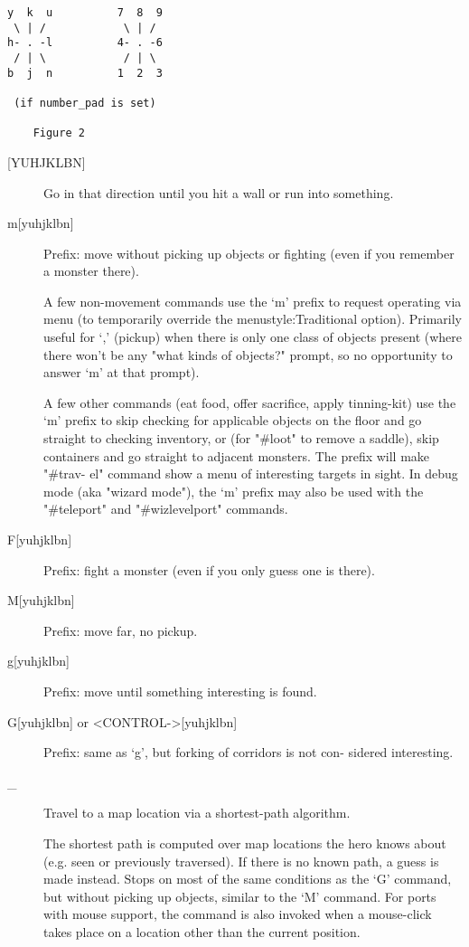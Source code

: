 \documentclass[11pt]{article}
\begin{document}
\begin{verbatim}
y  k  u          7  8  9
 \ | /            \ | /
h- . -l          4- . -6
 / | \            / | \
b  j  n          1  2  3

 (if number_pad is set)

	Figure 2
\end{verbatim}

\begin{description}
\item[{[YUHJKLBN]}] Go in that direction until you hit a wall or run into
something.

\item[{m[yuhjklbn]}] Prefix:   move  without picking up objects or
fighting (even if you remember a monster there).  

A few non-movement commands use the `m'  prefix to request operating
via menu (to temporarily override the menustyle:Traditional option).
Primarily useful for `,' (pickup) when there is only one class of
objects present (where there won't be any "what kinds of objects?"
prompt, so no opportunity to answer `m' at that prompt). 

A few other commands (eat food, offer sacrifice, apply tinning-kit)
use the `m' prefix to skip checking for applicable objects on the
floor and go straight to checking inventory, or (for "\#loot" to
remove a saddle), skip containers and go straight to adjacent
monsters. The prefix will make "\#trav- el" command show a menu of
interesting targets in sight. In debug mode (aka "wizard mode"), the
`m' prefix may also be used with the "\#teleport" and "\#wizlevelport"
commands.

\item[{F[yuhjklbn]}] Prefix: fight a monster (even if you only guess one
is there).

\item[{M[yuhjklbn]}] Prefix: move far, no pickup.

\item[{g[yuhjklbn]}] Prefix: move until something interesting is found.

\item[{G[yuhjklbn] or <CONTROL->[yuhjklbn]}] Prefix:  same as `g', but
forking of corridors is not con- sidered interesting.

\item[{\_}] Travel to a map location via a shortest-path algorithm.

The shortest path is computed over map locations the hero knows
about (e.g. seen or previously traversed). If there is no known
path, a guess is made instead. Stops on most of the same conditions
as the `G' command, but without picking up objects, similar to the
`M' command.  For ports with mouse support, the command is also
invoked when a mouse-click takes place on a location other than the
current position.


\end{description}
\end{document}
